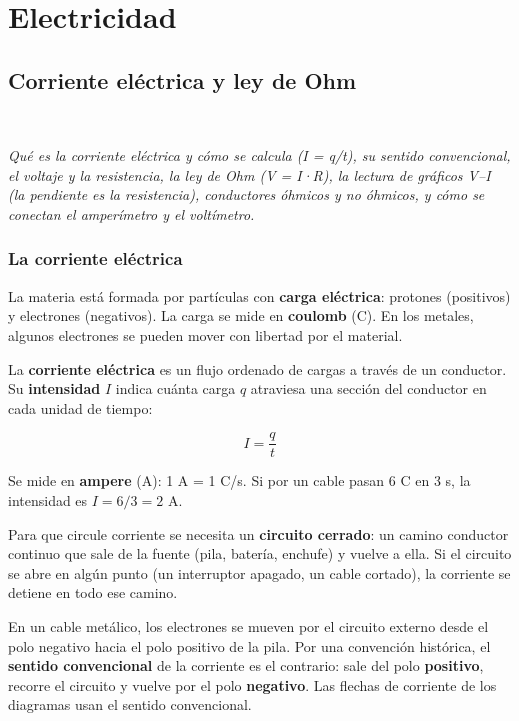 \chapter{Electricidad}
\section[Corriente eléctrica y ley de Ohm]{Corriente eléctrica y ley de Ohm}
\modcomun\ \ {\color{gris}\itshape Qué es la corriente eléctrica y cómo se calcula (I = q/t), su sentido convencional, el voltaje y la resistencia, la ley de Ohm (V = I·R), la lectura de gráficos V--I (la pendiente es la resistencia), conductores óhmicos y no óhmicos, y cómo se conectan el amperímetro y el voltímetro.\par}
\subsection{La corriente eléctrica}
La materia está formada por partículas con \textbf{carga eléctrica}: protones (positivos) y electrones (negativos). La carga se mide en \textbf{coulomb} (C). En los metales, algunos electrones se pueden mover con libertad por el material.

 

La \textbf{corriente eléctrica} es un flujo ordenado de cargas a través de un conductor. Su \textbf{intensidad} $I$ indica cuánta carga $q$ atraviesa una sección del conductor en cada unidad de tiempo:

 \[ I = \dfrac{q}{t} \] 

Se mide en \textbf{ampere} (A): 1 A = 1 C/s. Si por un cable pasan 6 C en 3 s, la intensidad es $I = 6/3 = 2$ A.

 

Para que circule corriente se necesita un \textbf{circuito cerrado}: un camino conductor continuo que sale de la fuente (pila, batería, enchufe) y vuelve a ella. Si el circuito se abre en algún punto (un interruptor apagado, un cable cortado), la corriente se detiene en todo ese camino.

  
\begin{clave} En un cable metálico, los electrones se mueven por el circuito externo desde el polo negativo hacia el polo positivo de la pila. Por una convención histórica, el \textbf{sentido convencional} de la corriente es el contrario: sale del polo \textbf{positivo}, recorre el circuito y vuelve por el polo \textbf{negativo}. Las flechas de corriente de los diagramas usan el sentido convencional.\end{clave}
 
